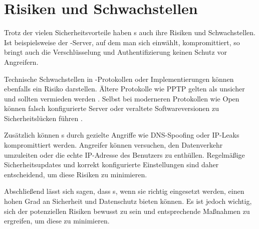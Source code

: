 \section{Risiken und Schwachstellen}

Trotz der vielen Sicherheitsvorteile haben s auch ihre Risiken und Schwachstellen. Ist beispielsweise der -Server, auf dem man sich einwählt, kompromittiert, so bringt auch die Verschlüsselung und Authentifizierung keinen Schutz vor Angreifern. 

Technische Schwachstellen in -Protokollen oder Implementierungen können ebenfalls ein Risiko darstellen. Ältere Protokolle wie \gls{PPTP} gelten als unsicher und sollten vermieden werden \cite{BSI_VPN_10}. Selbst bei moderneren Protokollen wie Open können falsch konfigurierte Server oder veraltete Softwareversionen zu Sicherheitslücken führen \cite{OpenVPN_Security_Advisories}.

Zusätzlich können s durch gezielte Angriffe wie DNS-Spoofing oder IP-Leaks kompromittiert werden. Angreifer können versuchen, den Datenverkehr umzuleiten oder die echte IP-Adresse des Benutzers zu enthüllen. Regelmäßige Sicherheitsupdates und korrekt konfigurierte Einstellungen sind daher entscheidend, um diese Risiken zu minimieren. \cite{Lyu2022}

Abschließend lässt sich sagen, dass s, wenn sie richtig eingesetzt werden, einen hohen Grad an Sicherheit und Datenschutz bieten können. Es ist jedoch wichtig, sich der potenziellen Risiken bewusst zu sein und entsprechende Maßnahmen zu ergreifen, um diese zu minimieren.